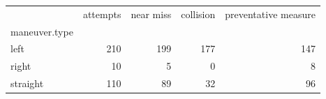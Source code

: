 \begin{tabular}{lrrrr}
\toprule
 & attempts & near miss & collision & preventative measure \\
maneuver.type &  &  &  &  \\
\midrule
left & 210 & 199 & 177 & 147 \\
right & 10 & 5 & 0 & 8 \\
straight & 110 & 89 & 32 & 96 \\
\bottomrule
\end{tabular}
